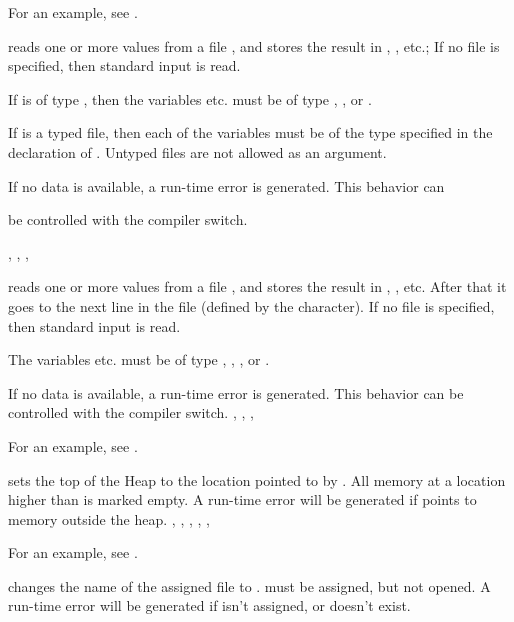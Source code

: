 \documentclass{report}
\begin{document}
For an example, see .

{ reads one or more values from a file , and stores the
result in , , etc.; If no file  is specified, then
standard input is read.

If  is of type , then the variables  etc. must be
of type , ,  or .

If  is a typed file, then each of the variables must be of the type
specified in the declaration of . Untyped files are not allowed as an
argument.}
{If no data is available, a run-time error is generated. This behavior can

be controlled with the  compiler switch.}
{, , , }




{ reads one or more values from a file , and stores the
result in , , etc. After that it goes to the next line in
the file (defined by the  character). 
If no file  is specified, then standard input is read.

The variables  etc. must be of type , , 
,  or .
}
{If no data is available, a run-time error is generated. This behavior can
be controlled with the  compiler switch.}
{, , , }

For an example, see .

{ sets the top of the Heap to the location pointed to by
. All memory at a location higher than  is marked empty.}
{A run-time error will be generated if  points to memory outside the
heap.}
{, , , , 
, }

For an example, see .

{ changes the name of the assigned file  to .
must be assigned, but not opened.}
{A run-time error will be generated if  isn't assigned, 
or doesn't exist.}
{}
\end{document}
